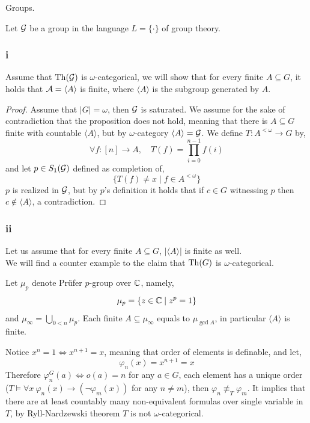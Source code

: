\question{}
Groups.

\subquestion{}
Let $\mathcal{G}$ be a group in the language $L = \{ \cdot \}$ of group theory.

\subsubsection{i}
Assume that $\operatorname{Th}(\mathcal{G})$ is $\omega$-categorical,
we will show that for every finite $A \subseteq G$, it holds that $\mathcal{A} = \langle A \rangle$ is finite, where $\langle A \rangle$ is the subgroup generated by $A$.
\begin{proof}
	Assume that $|G| = \omega$, then $\mathcal{G}$ is saturated.
	We assume for the sake of contradiction that the proposition does not hold, meaning that there is $A \subseteq G$ finite with countable $\langle A \rangle$, but by $\omega$-category $\langle A \rangle = \mathcal{G}$.
	We define $T : A^{< \omega} \to G$ by,
	\[
		\forall f : [n] \to A,
		\quad
		T(f)
		= \prod_{i = 0}^{n - 1} f(i)
	\]
	and let $p \in S_1(\mathcal{G})$ defined as completion of,
	\[
		\{ T(f) \ne x \mid f \in A^{< \omega} \}
	\]
	$p$ is realized in $\mathcal{G}$, but by $p$'s definition it holds that if $c \in G$ witnessing $p$ then $c \notin \langle A \rangle$, a contradiction.
\end{proof}

\subsubsection{ii}
Let us assume that for every finite $A \subseteq G$, $|\langle A \rangle|$ is finite as well. \\
We will find a counter example to the claim that $\operatorname{Th}(G)$ is $\omega$-categorical.
\begin{solution}
	Let $\mu_p$ denote Prüfer $p$-group over $\mathbb{C}$, namely,
	\[
		\mu_p
		= \{ z \in \mathbb{C} \mid z^p = 1 \}
	\]
	and $\mu_{\infty} = \bigcup_{0 < n} \mu_p$.
	Each finite $A \subseteq \mu_{\infty}$ equals to $\mu_{\gcd A}$, in particular $\langle A \rangle$ is finite.

	Notice $x^n = 1 \iff x^{n + 1} = x$, meaning that order of elements is definable, and let,
	\[
		\varphi_n(x)
		= x^{n + 1} = x
	\]
	Therefore $\varphi_n^G(a) \iff o(a) = n$ for any $a \in G$, each element has a unique order ($T \models \forall x\ \varphi_n(x) \to (\lnot \varphi_m(x))$ for any $n \ne m$), then $\varphi_n \not\equiv_T \varphi_m$.
	It implies that there are at least countably many non-equivalent formulas over single variable in $T$, by Ryll-Nardzewski theorem $T$ is not $\omega$-categorical.
\end{solution}

